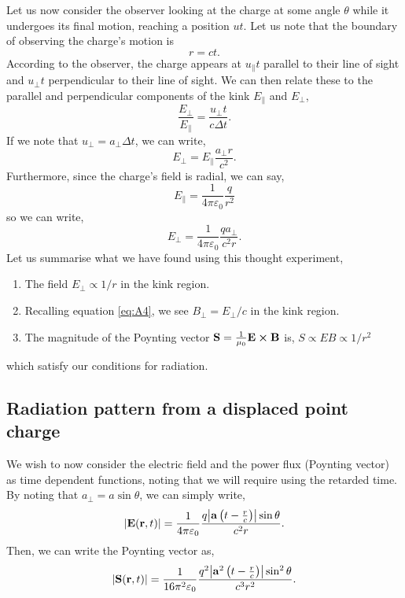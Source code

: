 \documentclass{book}
\begin{document}
\\\\
Let us now consider the observer looking at the charge at some angle $\theta$ while it undergoes its final motion, reaching a position $ut$. Let us note that the boundary of observing the charge's motion is
\begin{equation}
	r = ct.
\end{equation}
According to the observer, the charge appears at $u_{\parallel}t$ parallel to their line of sight and  $u_{\perp}t$ perpendicular to their line of sight. We can then relate these to the parallel and perpendicular components of the kink $E_{\parallel}$ and $E_{\perp}$,
\begin{equation}
	\frac{E_{\perp}}{E_{\parallel}} = \frac{u_{\perp} t}{c\Delta t}.
\end{equation}  
If we note that $u_{\perp} = a_{\perp}\Delta t$, we can write,
\begin{equation}
	E_{\perp} = E_{\parallel}\frac{a_{\perp}r}{c^2}.
\end{equation}
Furthermore, since the charge's field is radial, we can say,
\begin{equation}
	E_{\parallel} = \frac{1}{4\pi\varepsilon_0}\frac{q}{r^2}
\end{equation}
so we can write,
\begin{equation}
	E_{\perp} = \frac{1}{4\pi\varepsilon_0}\frac{qa_{\perp}}{c^2r}.
\end{equation}
Let us summarise what we have found using this thought experiment,
\begin{enumerate}
	\item The field $E_{\perp} \propto 1/r$ in the kink region.
	\item Recalling equation \eqref{eq:A4}, we see $B_{\perp} = E_{\perp}/c$ in the kink region.
	\item The magnitude of the Poynting vector $\vb{S} = \frac{1}{\mu_0}\vb{E}\cross\vb{B}$ is, $S \propto EB \propto 1/r^2$
\end{enumerate}
which satisfy our conditions for radiation.
\subsection{Radiation pattern from a displaced point charge}
We wish to now consider the electric field and the power flux (Poynting vector) as time dependent functions, noting that we will require using the retarded time. By noting that $a_{\perp} = a \sin\theta$, we can simply write,
\begin{equation}
	\abs{\vb{E}(\vb{r},t)} = \frac{1}{4\pi\varepsilon_0}\frac{q\abs{\vb{a}\left(t - \frac{r}{c}\right)}\sin\theta}{c^2r}.
\end{equation}
Then, we can write the Poynting vector as,
\begin{equation}
	\abs{\vb{S}(\vb{r},t)} = \frac{1}{16\pi^2\varepsilon_0}\frac{q^2\abs{\vb{a}^2\left(t - \frac{r}{c}\right)}\sin^2\theta}{c^3r^2}. \label{eq:poynt}
\end{equation}
\end{document}
